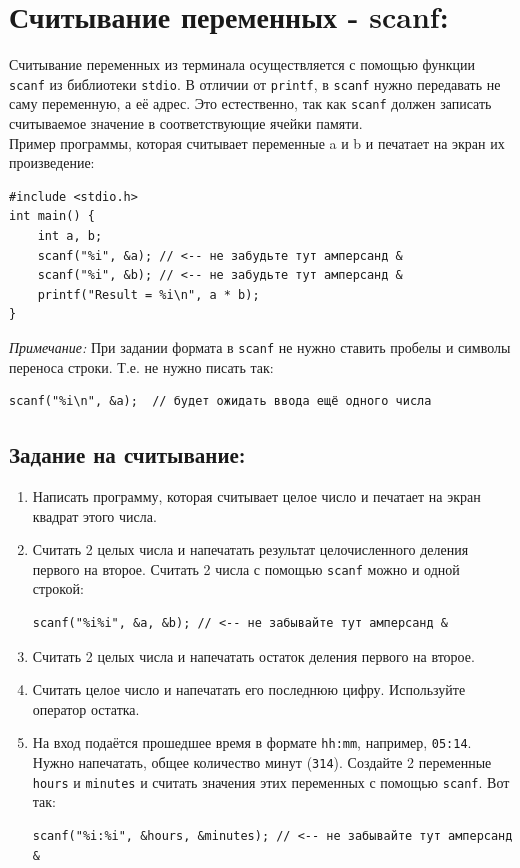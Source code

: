 \documentclass{article}
\begin{document}
\section*{Считывание переменных - scanf:}
Считывание переменных из терминала осуществляется с помощью функции \texttt{scanf} из библиотеки \texttt{stdio}. В отличии от \texttt{printf}, в \texttt{scanf} нужно передавать не саму переменную, а её адрес. Это естественно, так как \texttt{scanf} должен записать считываемое значение в соответствующие ячейки памяти.\\
Пример программы, которая считывает переменные a и b и печатает на экран их произведение:
\begin{lstlisting}
#include <stdio.h>
int main() {
    int a, b;
    scanf("%i", &a); // <-- не забудьте тут амперсанд &
    scanf("%i", &b); // <-- не забудьте тут амперсанд &
    printf("Result = %i\n", a * b);
}
\end{lstlisting}
\textit{Примечание:} При задании формата в \texttt{scanf} не нужно ставить пробелы и символы переноса строки. Т.е. не нужно писать так:
\begin{lstlisting}
scanf("%i\n", &a);  // будет ожидать ввода ещё одного числа
\end{lstlisting}

\subsection*{Задание на считывание:}
\begin{enumerate}
\item Написать программу, которая считывает целое число и печатает на экран квадрат этого числа.
\item Считать 2 целых числа и напечатать результат целочисленного деления первого на второе. Считать 2 числа с помощью \texttt{scanf} можно и одной строкой: 
\begin{lstlisting}
scanf("%i%i", &a, &b); // <-- не забывайте тут амперсанд &
\end{lstlisting}

\item Считать 2 целых числа и напечатать остаток деления первого на второе.
\item Считать целое число и напечатать его последнюю цифру. Используйте оператор остатка.
\item На вход подаётся прошедшее время в формате \texttt{hh:mm}, например, \texttt{05:14}. Нужно напечатать, общее количество минут (\texttt{314}). Создайте 2 переменные \texttt{hours} и \texttt{minutes} и считать значения этих переменных с помощью \texttt{scanf}. Вот так:
\begin{lstlisting}
scanf("%i:%i", &hours, &minutes); // <-- не забывайте тут амперсанд &
\end{lstlisting}
\end{enumerate}
\end{document}
